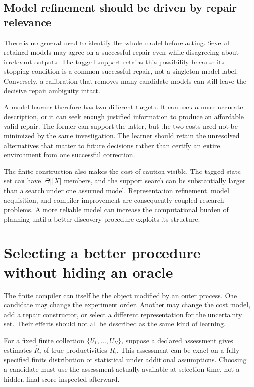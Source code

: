 \subsection{Model refinement should be driven by repair relevance}
There is no general need to identify the whole model before acting. Several retained models may agree on a successful repair even while disagreeing about irrelevant outputs. The tagged support retains this possibility because its stopping condition is a common successful repair, not a singleton model label. Conversely, a calibration that removes many candidate models can still leave the decisive repair ambiguity intact.

A model learner therefore has two different targets. It can seek a more accurate description, or it can seek enough justified information to produce an affordable valid repair. The former can support the latter, but the two costs need not be minimized by the same investigation. The learner should retain the unresolved alternatives that matter to future decisions rather than certify an entire environment from one successful correction.

The finite construction also makes the cost of caution visible. The tagged state set can have $|\Theta||X|$ members, and the support search can be substantially larger than a search under one assumed model. Representation refinement, model acquisition, and compiler improvement are consequently coupled research problems. A more reliable model can increase the computational burden of planning until a better discovery procedure exploits its structure.

\section{Selecting a better procedure without hiding an oracle}\label{SII:sec:selection}
The finite compiler can itself be the object modified by an outer process. One candidate may change the experiment order. Another may change the cost model, add a repair constructor, or select a different representation for the uncertainty set. Their effects should not all be described as the same kind of learning.

For a fixed finite collection $\{U_1,\ldots,U_N\}$, suppose a declared assessment gives estimates $\widehat R_i$ of true productivities $R_i$. This assessment can be exact on a fully specified finite distribution or statistical under additional assumptions. Choosing a candidate must use the assessment actually available at selection time, not a hidden final score inspected afterward.

